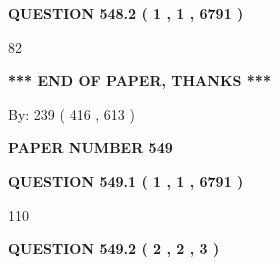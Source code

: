 \documentclass[12pt]{article}
\begin{document}
 
 
 
  
\vspace{0.2in}
  
{\textbf{\Large{QUESTION
548.2 
 ( 1 , 1 , 6791 )
}}}
  
  
 
 
\noindent{}

82
 
 
   
   
 \vspace{0.2in}
 
   
   
   
   
\vspace{1.0in} 
{\textbf{\large{ *** END OF PAPER, THANKS *** }}} 
   
   
\hspace{1.0in} By: 
 239 ( 416 ,  613 )
   
   
   
   
\newpage 
\setcounter{page}{ 
   549001 } 
   
   
   
   
 {\textbf{ \Large{ PAPER NUMBER  549  }}}
   
   
\vspace{0.2in}
   
   
   
   
   
   
 \vspace{0.2in}
 
 
 
 
   
   
  
\vspace{0.2in}
  
{\textbf{\Large{QUESTION
549.1 
 ( 1 , 1 , 6791 )
}}}
  
  
 
 
\noindent{}

110
 
 
  
\vspace{0.2in}
  
{\textbf{\Large{QUESTION
549.2 
 ( 2 , 2 , 3 )
}}}
  
  
 
 
\noindent{}
 
\end{document}
